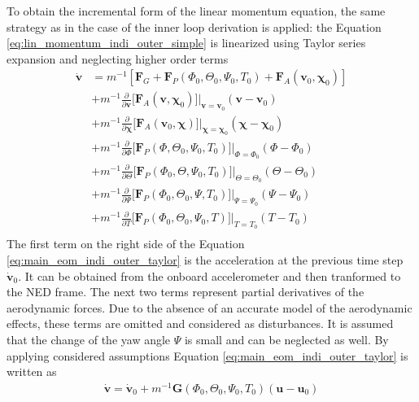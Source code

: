 \documentclass[11pt, a4paper, twoside]{report}
\begin{document}
To obtain the incremental form of the linear momentum equation, the same strategy as in the case of the inner loop derivation is applied: the Equation \ref{eq:lin_momentum_indi_outer_simple} is linearized using Taylor series expansion and neglecting higher order terms
\begin{equation}
	\begin{split}
		\bm{\dot{v}} &= m^{-1} [\bm{F}_G + \bm{F}_P(\Phi_0, \Theta_0, \Psi_0, T_0)+ \bm{F}_A(\bm{v}_0, \bm{\chi}_0)]  \\		
		&+ m^{-1} \frac{\partial}{\partial \bm{v}} \big[ \bm{F}_A(\bm{v}, \bm{\chi}_0) \big] \bigg| _{\bm{v}=\bm{v}_0} (\bm{v}-\bm{v}_0) \\
		&+ m^{-1} \frac{\partial}{\partial \bm{\chi}} \big[ \bm{F}_A(\bm{v}_0, \bm{\chi}) \big] \bigg| _{\bm{\chi}=\bm{\chi}_0} (\bm{\chi}-\bm{\chi}_0) \\
		&+ m^{-1} \frac{\partial}{\partial \Phi} \big[ \bm{F}_P(\Phi, \Theta_0, \Psi_0, T_0) \big] \bigg| _{\Phi=\Phi_0} (\Phi-\Phi_0) \\
		&+ m^{-1} \frac{\partial}{\partial \Theta} \big[ \bm{F}_P(\Phi_0, \Theta, \Psi_0, T_0) \big] \bigg| _{\Theta=\Theta_0} (\Theta-\Theta_0) \\
		&+ m^{-1} \frac{\partial}{\partial \Psi} \big[ \bm{F}_P(\Phi_0, \Theta_0, \Psi, T_0) \big] \bigg| _{\Psi=\Psi_0} (\Psi-\Psi_0) \\
		&+ m^{-1} \frac{\partial}{\partial T} \big[ \bm{F}_P(\Phi_0, \Theta_0, \Psi_0, T) \big] \bigg| _{T=T_0} (T-T_0) \\
		\label{eq:main_eom_indi_outer_taylor}
	\end{split}
\end{equation}
The first term on the right side of the Equation \ref{eq:main_eom_indi_outer_taylor} is the acceleration at the previous time step $\bm{\dot{v}}_0$. It can be obtained from the onboard accelerometer and then tranformed to the \acrshort{NED} frame. The next two terms represent partial derivatives of the aerodynamic forces. Due to the absence of an accurate model of the aerodynamic effects, these terms are omitted and considered as disturbances. It is assumed that the change of the yaw angle $\Psi$ is small and can be neglected as well. By applying considered assumptions Equation \ref{eq:main_eom_indi_outer_taylor} is written as 
\begin{equation}
	\begin{split}
		\bm{\dot{v}} = \bm{\dot{v}}_0 +  m^{-1} \bm{G}(\Phi_0, \Theta_0, \Psi_0, T_0) (\bm{u} - \bm{u}_0)
		\label{eq:lin_momentum_indi_outer_lin}
	\end{split}
\end{equation}
\end{document}
